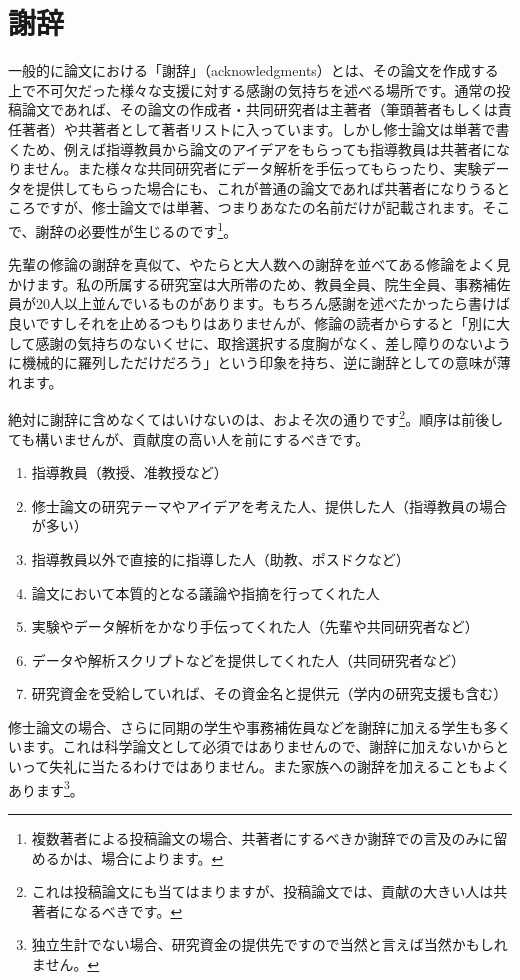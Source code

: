 \chapter*{謝辞}%

一般的に論文における「謝辞」（acknowledgments）とは、その論文を作成する上で不可欠だった様々な支援に対する感謝の気持ちを述べる場所です。通常の投稿論文であれば、その論文の作成者・共同研究者は主著者（筆頭著者もしくは責任著者）や共著者として著者リストに入っています。しかし修士論文は単著で書くため、例えば指導教員から論文のアイデアをもらっても指導教員は共著者になりません。また様々な共同研究者にデータ解析を手伝ってもらったり、実験データを提供してもらった場合にも、これが普通の論文であれば共著者になりうるところですが、修士論文では単著、つまりあなたの名前だけが記載されます。そこで、謝辞の必要性が生じるのです\footnote{複数著者による投稿論文の場合、共著者にするべきか謝辞での言及のみに留めるかは、場合によります。}。

先輩の修論の謝辞を真似て、やたらと大人数への謝辞を並べてある修論をよく見かけます。私の所属する研究室は大所帯のため、教員全員、院生全員、事務補佐員が20人以上並んでいるものがあります。もちろん感謝を述べたかったら書けば良いですしそれを止めるつもりはありませんが、修論の読者からすると「別に大して感謝の気持ちのないくせに、取捨選択する度胸がなく、差し障りのないように機械的に羅列しただけだろう」という印象を持ち、逆に謝辞としての意味が薄れます。

絶対に謝辞に含めなくてはいけないのは、およそ次の通りです\footnote{これは投稿論文にも当てはまりますが、投稿論文では、貢献の大きい人は共著者になるべきです。}。順序は前後しても構いませんが、貢献度の高い人を前にするべきです。
\begin{enumerate}
\item 指導教員（教授、准教授など）
\item 修士論文の研究テーマやアイデアを考えた人、提供した人（指導教員の場合が多い）
\item 指導教員以外で直接的に指導した人（助教、ポスドクなど）
\item 論文において本質的となる議論や指摘を行ってくれた人
\item 実験やデータ解析をかなり手伝ってくれた人（先輩や共同研究者など）
\item データや解析スクリプトなどを提供してくれた人（共同研究者など）
\item 研究資金を受給していれば、その資金名と提供元（学内の研究支援も含む）
\end{enumerate}

修士論文の場合、さらに同期の学生や事務補佐員などを謝辞に加える学生も多くいます。これは科学論文として必須ではありませんので、謝辞に加えないからといって失礼に当たるわけではありません。また家族への謝辞を加えることもよくあります\footnote{独立生計でない場合、研究資金の提供先ですので当然と言えば当然かもしれません。}。

